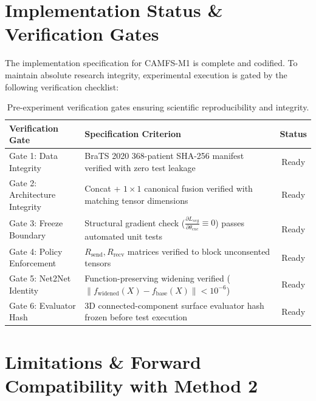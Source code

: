 \documentclass[10pt,a4paper]{article}
\begin{document}
\clearpage
\section{Implementation Status \& Verification Gates}

The implementation specification for CAMFS-M1 is complete and codified. To maintain absolute research integrity, experimental execution is gated by the following verification checklist:

\begin{table}[h]
\centering
\small
\renewcommand{\arraystretch}{1.15}
\begin{tabularx}{\textwidth}{l X c}
\toprule
\textbf{Verification Gate} & \textbf{Specification Criterion} & \textbf{Status} \\
\midrule
Gate 1: Data Integrity & BraTS 2020 368-patient SHA-256 manifest verified with zero test leakage & Ready \\
Gate 2: Architecture Integrity & Concat + $1\times 1$ canonical fusion verified with matching tensor dimensions & Ready \\
Gate 3: Freeze Boundary & Structural gradient check ($\frac{\partial L_{seg}}{\partial \theta_{enc}} \equiv 0$) passes automated unit tests & Ready \\
Gate 4: Policy Enforcement & $R_{\text{send}}, R_{\text{recv}}$ matrices verified to block unconsented tensors & Ready \\
Gate 5: Net2Net Identity & Function-preserving widening verified ($\|f_{\text{widened}}(X) - f_{\text{base}}(X)\| < 10^{-6}$) & Ready \\
Gate 6: Evaluator Hash & 3D connected-component surface evaluator hash frozen before test execution & Ready \\
\bottomrule
\end{tabularx}
\caption{Pre-experiment verification gates ensuring scientific reproducibility and integrity.}
\label{tab:gates}
\end{table}

\section{Limitations \& Forward Compatibility with Method 2}
\end{document}
